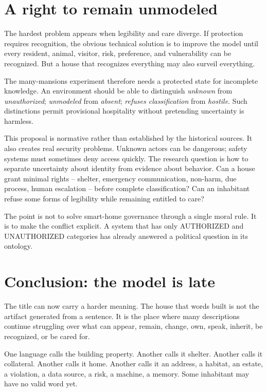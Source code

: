 \documentclass[11pt]{article}
\begin{document}
\section{A right to remain unmodeled}

The hardest problem appears when legibility and care diverge. If protection requires recognition, the obvious technical solution is to improve the model until every resident, animal, visitor, risk, preference, and vulnerability can be recognized. But a house that recognizes everything may also surveil everything.

The many-mansions experiment therefore needs a protected state for incomplete knowledge. An environment should be able to distinguish \emph{unknown} from \emph{unauthorized}; \emph{unmodeled} from \emph{absent}; \emph{refuses classification} from \emph{hostile}. Such distinctions permit provisional hospitality without pretending uncertainty is harmless.

This proposal is normative rather than established by the historical sources. It also creates real security problems. Unknown actors can be dangerous; safety systems must sometimes deny access quickly. The research question is how to separate uncertainty about identity from evidence about behavior. Can a house grant minimal rights -- shelter, emergency communication, non-harm, due process, human escalation -- before complete classification? Can an inhabitant refuse some forms of legibility while remaining entitled to care?

The point is not to solve smart-home governance through a single moral rule. It is to make the conflict explicit. A system that has only AUTHORIZED and UNAUTHORIZED categories has already answered a political question in its ontology.

\section{Conclusion: the model is late}

The title can now carry a harder meaning. The house that words built is not the artifact generated from a sentence. It is the place where many descriptions continue struggling over what can appear, remain, change, own, speak, inherit, be recognized, or be cared for.

One language calls the building property. Another calls it shelter. Another calls it collateral. Another calls it home. Another calls it an address, a habitat, an estate, a violation, a data source, a risk, a machine, a memory. Some inhabitant may have no valid word yet.
\end{document}
